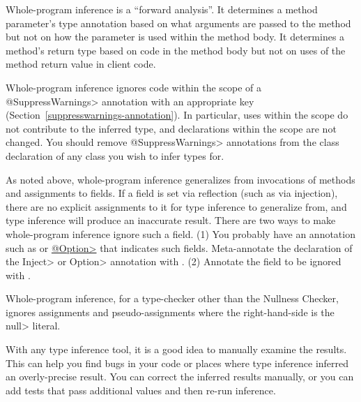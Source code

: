 Whole-program inference is a ``forward analysis''.
It determines a method parameter's type
annotation based on what arguments are passed to the method but not on how the
parameter is used within the method body.
It determines a method's return type based on code in the method body but
not on uses of the method return value in client code.



Whole-program inference ignores code within the scope of a
\<@SuppressWarnings> annotation with an appropriate key
(Section~\ref{suppresswarnings-annotation}).  In particular, uses within
the scope do not contribute to the inferred type, and declarations within
the scope are not changed.  You should remove \<@SuppressWarnings> annotations
from the class declaration of any class you wish to infer types for.

As noted above, whole-program inference generalizes from invocations of methods and
assignments to fields.  If a field is set via
reflection (such as via injection), there are no explicit assignments to it
for type inference to generalize from, and type inference will produce
an inaccurate result.  There are two ways to make whole-program inference
ignore such a field.
%
(1)
You probably have an annotation such as
or
\href{https://types.cs.washington.edu/plume-lib/api/plume/Option.html}{\<@Option>}
that indicates such fields.  Meta-annotate the declaration of the \<Inject>
or \<Option> annotation with
.
%
(2)
Annotate the field to be ignored with
.

Whole-program inference, for a type-checker other than the Nullness Checker,
ignores assignments and pseudo-assignments where the right-hand-side is the \<null> literal.



With any type inference tool, it is a good idea to manually examine the
results.  This can help you find bugs in your code or places where type
inference inferred an overly-precise result.
You can correct the inferred results manually, or you can
add tests that pass additional values and then re-run inference.

